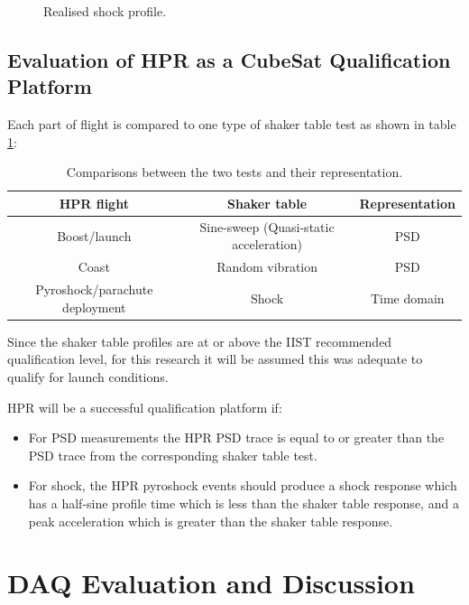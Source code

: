 \documentclass{report}
\begin{document}
\begin{figure}[H]
  \centering
  
  \caption{Realised shock profile.}
  \label{fig:shock-table-profile}
\end{figure}

\section{Evaluation of HPR as a CubeSat Qualification Platform}

Each part of flight is compared to one type of shaker table test as shown in table \ref{tabl:compare-tests}:

\begin{table}[H]
  \centering
  \begin{tabular}{|c|c|c|}
    \hline
    \textbf{HPR flight}            & \textbf{Shaker table}                  & \textbf{Representation} \\\hline
    Boost/launch                   & Sine-sweep (Quasi-static acceleration) & PSD                     \\\hline
    Coast                          & Random vibration                       & PSD                     \\\hline
    Pyroshock/parachute deployment & Shock                                  & Time domain             \\\hline
  \end{tabular}
  \caption{Comparisons between the two tests and their representation.}
  \label{tabl:compare-tests}
\end{table}

Since the shaker table profiles are at or above the IIST recommended qualification level, for this research it will be assumed this was adequate to qualify for launch conditions.

HPR will be a successful qualification platform if:
\begin{itemize}
  \item For PSD measurements the HPR PSD trace is equal to or greater than the PSD trace from the corresponding shaker table test.
  \item For shock, the HPR pyroshock events should produce a shock response which has a half-sine profile time which is less than the shaker table response, and a peak acceleration which is greater than the shaker table response.
\end{itemize}

\chapter{DAQ Evaluation and Discussion}
\end{document}
